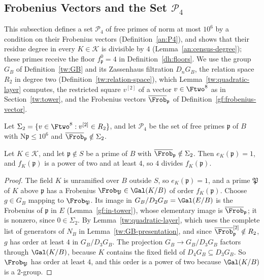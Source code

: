 \subsection{Frobenius Vectors and the Set $\mathcal P_4$}
\label{an:census}
This subsection defines a set $\mathcal P_4$ of free primes of norm at
most $10^6$ by a condition on their Frobenius vectors
(Definition~\ref{an:P4}), and shows that their residue degree in every
$K\in\mathcal K$ is divisible by $4$ (Lemma~\ref{an:census-degree}); these
primes receive the floor
$f^0_{\mathfrak p}=4$ in Definition~\ref{dh:floors}. We use the group $G_B$ of Definition~\ref{tw:GB} and its Zassenhaus
filtration $D_nG_B$, the relation space $R_2$ in degree two
(Definition~\ref{tw:relation-space}), which Lemma~\ref{tw:quadratic-layer}
computes, the restricted square $v^{[2]}$ of a vector $v\in\Ftwo^8$ as in
Section~\ref{tw:tower}, and the Frobenius vectors
$\overline{\Frob}_{\mathfrak p}$ of Definition~\ref{gf:frobenius-vector}.

\begin{definition}\label{an:P4}
Let $\Sigma_2=\{v\in\Ftwo^8:v^{[2]}\in R_2\}$, and let $\mathcal P_4$ be the
set of free primes $\mathfrak p$ of $B$ with $\mathrm N\mathfrak p\le10^6$
and $\overline{\Frob}_{\mathfrak p}\notin\Sigma_2$.
\end{definition}

\begin{lemma}\label{an:census-degree}
Let $K\in\mathcal K$, and let $\mathfrak p\notin S$ be a prime of $B$ with
$\overline{\Frob}_{\mathfrak p}\notin\Sigma_2$. Then $e_K(\mathfrak p)=1$, and
$f_K(\mathfrak p)$ is a power of two and at least $4$, so $4$ divides
$f_K(\mathfrak p)$.
\end{lemma}

\begin{proof}
The field $K$ is unramified over $B$ outside $S$, so $e_K(\mathfrak p)=1$,
and a prime $\mathfrak P$ of $K$ above $\mathfrak p$ has a Frobenius
$\Frob_{\mathfrak P}\in\Gal(K/B)$ of order $f_K(\mathfrak p)$. Choose
$g\in G_B$ mapping to $\Frob_{\mathfrak P}$. Its image in
$G_B/D_2G_B=\Gal(E/B)$ is the Frobenius of $\mathfrak p$ in $E$
(Lemma~\ref{gf:in-tower}), whose elementary image is $\overline{\Frob}_{\mathfrak p}$; it is
nonzero, since $0\in\Sigma_2$. By Lemma~\ref{tw:quadratic-layer}, which uses
the complete list of generators of $N_B$ in
Lemma~\ref{tw:GB-presentation}, and since $\overline{\Frob}_{\mathfrak p}^{[2]}\notin R_2$,
$g$ has order at least $4$ in $G_B/D_3G_B$. The projection $G_B\to G_B/D_3G_B$
factors through $\Gal(K/B)$, because $K$ contains the fixed field of
$D_4G_B\subseteq D_3G_B$. So $\Frob_{\mathfrak P}$ has order at least $4$, and
this order is a power of two because $\Gal(K/B)$ is a $2$-group.
\end{proof}



